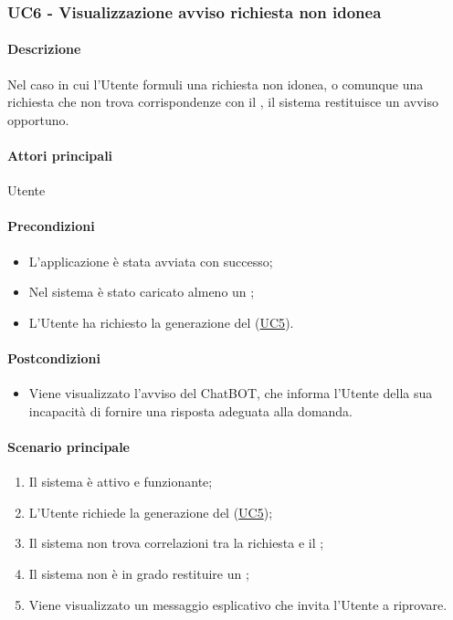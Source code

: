 \subsubsection{UC6 - Visualizzazione avviso richiesta non idonea}\label{UC6}
\paragraph*{Descrizione}
Nel caso in cui l'Utente formuli una richiesta non idonea, o comunque una richiesta che non trova corrispondenze con il , il sistema restituisce un avviso opportuno.

\paragraph*{Attori principali}
Utente

\paragraph*{Precondizioni}
\begin{itemize}
  \item L'applicazione è stata avviata con successo;
  \item Nel sistema è stato caricato almeno un ;
  \item L'Utente ha richiesto la generazione del  (\hyperref[UC5]{UC5}).  
\end{itemize}

\paragraph*{Postcondizioni}
\begin{itemize}
  \item Viene visualizzato l'avviso del ChatBOT, che informa l'Utente della sua incapacità di fornire una risposta adeguata alla domanda.
\end{itemize}

\paragraph*{Scenario principale}
\begin{enumerate}
  \item Il sistema è attivo e funzionante;
  \item L'Utente richiede la generazione del  (\hyperref[UC5]{UC5});
  \item Il sistema non trova correlazioni tra la richiesta e il ;
  \item Il sistema non è in grado restituire un ;
  \item Viene visualizzato un messaggio esplicativo che invita l'Utente a riprovare.
\end{enumerate}